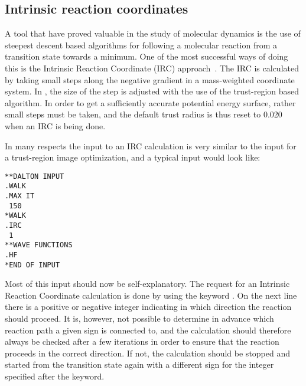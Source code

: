 \subsection{Intrinsic reaction coordinates}\label{sec:irc}

\begin{center}
\end{center}

A tool that have proved valuable in the study of molecular
dynamics
is the use of steepest descent based algorithms
for following a molecular reaction from a transition
state towards a minimum. One of the
most successful ways of doing this is the Intrinsic Reaction Coordinate (IRC)
approach~\cite{kfacr14,pmjcp88}. The IRC is calculated by taking small steps along the
negative gradient in a mass-weighted coordinate system. In \dalton , the
size of the step is adjusted with the use of the trust-region based
algorithm. In order to get a sufficiently accurate potential energy surface,
rather small steps must be taken, and the default trust radius is thus reset
to 0.020 when an IRC is being done.

In many respects the input to an IRC calculation is very similar to
the input for a trust-region image optimization,
and a typical input would look like:

\begin{verbatim}
**DALTON INPUT
.WALK
.MAX IT
 150
*WALK
.IRC
 1
**WAVE FUNCTIONS
.HF
*END OF INPUT
\end{verbatim}

Most of this input should now be self-explanatory. The request for an
Intrinsic Reaction Coordinate calculation is done by using the keyword
. On the next line there is a positive or negative integer
indicating in which direction the reaction should proceed. It is,
however, not possible to determine in advance which reaction path a
given sign is connected to, and the calculation should therefore
always be checked after a few iterations in order to ensure that the
reaction proceeds in the correct direction. If not, the calculation
should be stopped and started from the transition state again with a
different sign for the integer specified after the  keyword.

